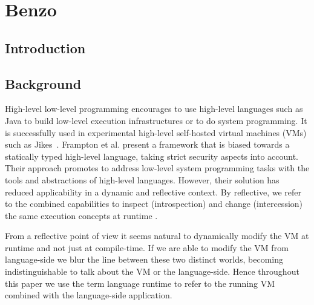 

\chapter{Benzo}
\minitoc


\section{Introduction}

\section{Background}
High-level low-level programming \cite{Fram09a} encourages to use high-level languages such as Java to build low-level execution infrastructures or to do system programming. 
It is successfully used in experimental high-level self-hosted virtual machines (VMs) such as Jikes~\cite{Alpe99a}.  
Frampton et al. present a framework that is biased towards a statically typed high-level language, taking strict security aspects into account.
Their approach promotes to address low-level system programming tasks with the tools and abstractions of high-level languages.
However, their solution has reduced applicability in a dynamic and reflective context.
By reflective, we refer to the combined capabilities to inspect (introspection) and change (intercession) the same execution concepts at runtime \cite{Maes87a}.

From a reflective point of view it seems natural to dynamically modify the VM at runtime and not just at compile-time.
If we are able to modify the VM from language-side we blur the line between these two distinct worlds, becoming indistinguishable to talk about the VM or the language-side.
Hence throughout this paper we use the term language runtime to refer to the running VM combined with the language-side application.


